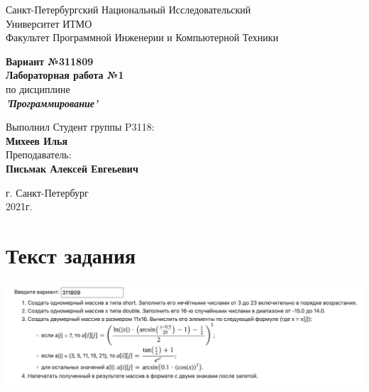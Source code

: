 \documentclass[12pt,onecolumn]{article}
\begin{document}
\begin{center}
    Санкт-Петербургский Национальный Исследовательский\\ 
    Университет ИТМО\\
    Факультет Программной Инженерии и Компьютерной Техники\\
\end{center}
\vspace{1cm}


\begin{center}
    \large \textbf{Вариант №311809}\\
    \textbf{Лабораторная работа №1}\\
    по дисциплине\\
    \textbf{\textit{'Программирование'}}
\end{center}

\vspace{3cm}
\begin{flushright}
  Выполнил Студент  группы P3118: \\
  \textbf{Михеев Илья}\\
  Преподаватель: \\
  \textbf{Письмак Алексей Евгеьевич}\\
\end{flushright}

\vspace{14cm}
\begin{center}
    г. Санкт-Петербург\\
    2021г.
\end{center}

\newpage
\section{Текст задания}
\includegraphics[width=\columnwidth]{task.png}
\end{document}
